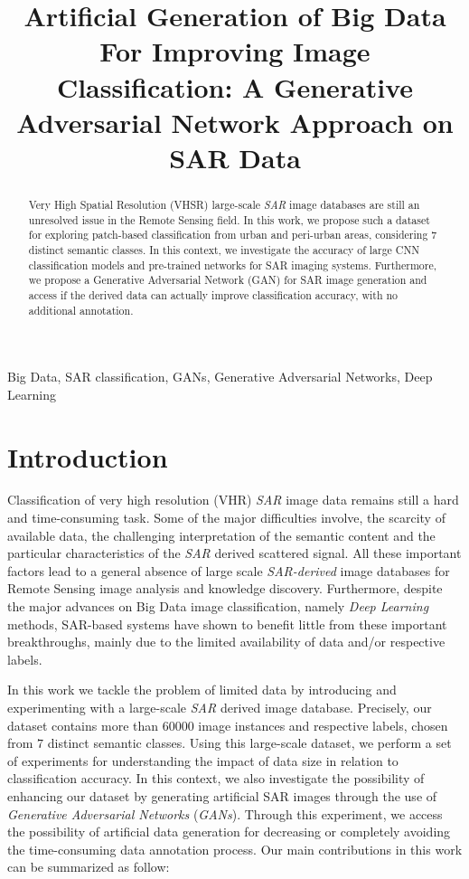 \documentclass{article}
\title{Artificial Generation of Big Data For Improving Image Classification: A Generative Adversarial Network Approach on SAR Data}
\begin{document}
	\maketitle
%
\begin{abstract}

Very High Spatial Resolution (VHSR) large-scale \emph{SAR} 
image databases are still an unresolved issue 
in the Remote Sensing field.
In this work, we propose such a dataset for 
exploring patch-based classification from 
urban and peri-urban areas, considering $7$ 
distinct semantic classes.
In this context, we investigate the accuracy of 
large CNN classification models and pre-trained 
networks for SAR imaging systems. 
Furthermore, we propose a 
Generative Adversarial Network (GAN) for SAR image
generation and access if the derived data can 
actually improve classification accuracy, with no 
additional annotation.

\end{abstract}
%

\begin{keywords}
Big Data, SAR classification, GANs, Generative Adversarial Networks, Deep Learning
\end{keywords}
%

\section{Introduction}
\label{sec:intro}

Classification of very high resolution (VHR) \emph{SAR} 
image data remains still a hard and time-consuming task.
%
Some of the major difficulties involve, the scarcity 
of available data, the challenging interpretation of 
the semantic content and the particular characteristics
of the \emph{SAR} derived scattered signal.
%
All these important factors lead to a general absence of large
scale \emph{SAR-derived} image databases for Remote Sensing
image analysis and knowledge discovery.
%
Furthermore, despite the major advances on Big Data 
image classification, namely \emph{Deep Learning} methods, 
SAR-based systems have shown to benefit little from these 
important breakthroughs, mainly due to the limited 
availability of data and/or respective labels.

In this work we tackle the problem of limited
data by introducing and experimenting with a large-scale 
\emph{SAR} derived image database.
%
Precisely, our dataset contains more than $60000$ image 
instances and respective labels, chosen from $7$ distinct 
semantic classes.
%
Using this large-scale dataset, we perform a set of 
experiments for understanding the impact of 
data size in relation to classification accuracy. 
%
In this context, we also investigate the possibility of 
enhancing our dataset by generating artificial SAR images 
through the use of \emph{Generative Adversarial Networks} (\emph{GANs}).
Through this experiment, we access the possibility of artificial 
data generation for decreasing or completely avoiding the time-consuming 
data annotation process.
%
Our main contributions in this work can be summarized as follow:
\end{document}
